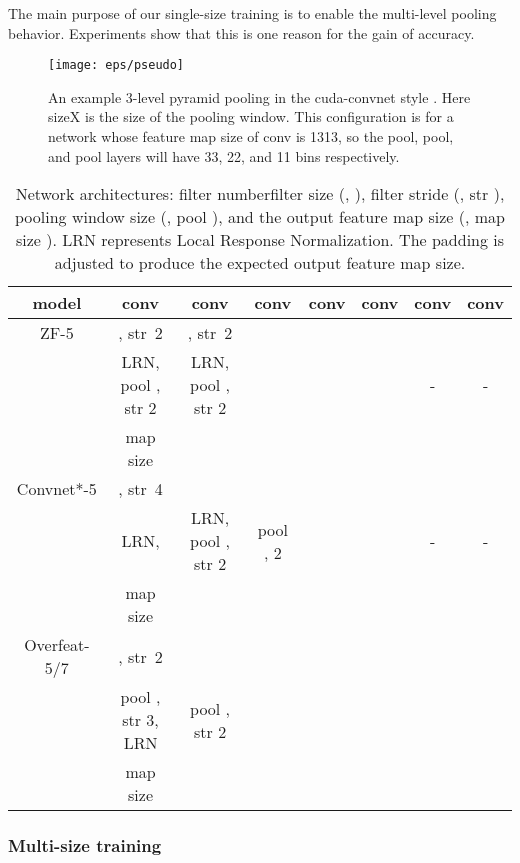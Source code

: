 \documentclass[10pt,journal,cspaper,compsoc]{IEEEtran}
\begin{document}
The main purpose of our single-size training is to enable the multi-level pooling behavior. Experiments show that this is one reason for the gain of accuracy.

\begin{figure}[t]
\center
\texttt{[image: eps/pseudo]}
\caption{An example 3-level pyramid pooling in the cuda-convnet style \cite{Krizhevsky2012}. Here sizeX is the size of the pooling window. This configuration is for a network whose feature map size of conv is 1313, so the pool, pool, and pool layers will have 33, 22, and 11 bins respectively.}
\label{fig:pseudo}
\end{figure}

\begin{table*}
\begin{center}
\begin{tabular}{c|c|c|c|c|c|c|c}
\hline
model & conv & conv & conv & conv & conv & conv & conv \\
\hline
ZF-5 & , str~2 & , str~2 &  &  &  &  &  \\
          & LRN, pool , str 2 & LRN, pool , str 2 &  &  &  & - & - \\
   & map size  &  &  &  &  &  &  \\
\hline
Convnet*-5 & , str~4 &  &  &  &  &  &  \\
          & LRN, & LRN, pool , str 2 & pool , 2 &  &  & - & - \\
   & map size  &  &  &  &  &  &  \\
\hline
Overfeat-5/7 & , str~2 &  &  &  &  &  & \\
          & pool , str 3, LRN & pool , str 2 &  &  &  &  &  \\
   & map size  &  &  &  &  &  & \\
\hline
\end{tabular}
\end{center}
\caption{Network architectures: filter numberfilter size (\eg, ), filter stride (\eg, str ), pooling window size (\eg, pool ), and the output feature map size (\eg, map size ). LRN represents Local Response Normalization. The padding is adjusted to produce the expected output feature map size.}
\label{tab:architectures}
\end{table*}

\subsubsection*{Multi-size training}
\end{document}
